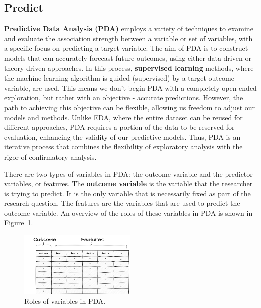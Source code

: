 \documentclass[
  letterpaper,
  DIV=11,
  numbers=noendperiod]{scrreport}
\theoremstyle{definition}
\theoremstyle{remark}
\begin{document}
\hypertarget{sec-aa-predict}{%
\subsection{Predict}\label{sec-aa-predict}}

\textbf{Predictive Data Analysis (PDA)} employs a variety of techniques
to examine and evaluate the association strength between a variable or
set of variables, with a specific focus on predicting a target variable.
The aim of PDA is to construct models that can accurately forecast
future outcomes, using either data-driven or theory-driven approaches.
In this process, \textbf{supervised learning} methods, where the machine
learning algorithm is guided (supervised) by a target outcome variable,
are used. This means we don't begin PDA with a completely open-ended
exploration, but rather with an objective - accurate predictions.
However, the path to achieving this objective can be flexible, allowing
us freedom to adjust our models and methods. Unlike EDA, where the
entire dataset can be reused for different approaches, PDA requires a
portion of the data to be reserved for evaluation, enhancing the
validity of our predictive models. Thus, PDA is an iterative process
that combines the flexibility of exploratory analysis with the rigor of
confirmatory analysis.

There are two types of variables in PDA: the outcome variable and the
predictor variables, or features. The \textbf{outcome variable} is the
variable that the researcher is trying to predict. It is the only
variable that is necessarily fixed as part of the research question. The
features are the variables that are used to predict the outcome
variable. An overview of the roles of these variables in PDA is shown in
Figure~\ref{fig-pda-variables}.

\begin{figure}[H]

{\centering \includegraphics[width=0.5\textwidth,height=\textheight]{figures/approaching-analysis/aa-pda-variables.drawio.png}

}

\caption{\label{fig-pda-variables}Roles of variables in PDA.}

\end{figure}
\end{document}
